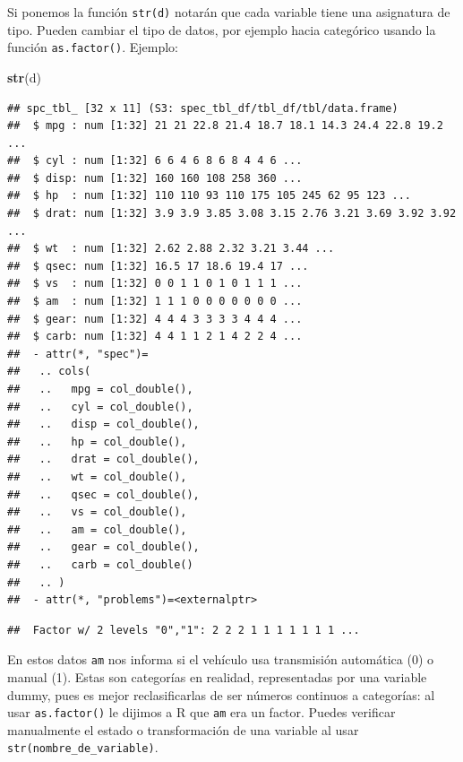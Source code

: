 \documentclass[
]{article}
\newenvironment{Shaded}{\begin{snugshade}}{\end{snugshade}}
\newcommand{\FunctionTok}[1]{\textcolor[rgb]{0.13,0.29,0.53}{\textbf{#1}}}
\newcommand{\NormalTok}[1]{#1}
\newcommand{\OtherTok}[1]{\textcolor[rgb]{0.56,0.35,0.01}{#1}}
\newcommand{\SpecialCharTok}[1]{\textcolor[rgb]{0.81,0.36,0.00}{\textbf{#1}}}
\begin{document}
Si ponemos la función \texttt{str(d)} notarán que cada variable tiene
una asignatura de tipo. Pueden cambiar el tipo de datos, por ejemplo
hacia categórico usando la función \texttt{as.factor()}. Ejemplo:

\begin{Shaded}
\begin{Highlighting}[]
\FunctionTok{str}\NormalTok{(d)}
\end{Highlighting}
\end{Shaded}

\begin{verbatim}
## spc_tbl_ [32 x 11] (S3: spec_tbl_df/tbl_df/tbl/data.frame)
##  $ mpg : num [1:32] 21 21 22.8 21.4 18.7 18.1 14.3 24.4 22.8 19.2 ...
##  $ cyl : num [1:32] 6 6 4 6 8 6 8 4 4 6 ...
##  $ disp: num [1:32] 160 160 108 258 360 ...
##  $ hp  : num [1:32] 110 110 93 110 175 105 245 62 95 123 ...
##  $ drat: num [1:32] 3.9 3.9 3.85 3.08 3.15 2.76 3.21 3.69 3.92 3.92 ...
##  $ wt  : num [1:32] 2.62 2.88 2.32 3.21 3.44 ...
##  $ qsec: num [1:32] 16.5 17 18.6 19.4 17 ...
##  $ vs  : num [1:32] 0 0 1 1 0 1 0 1 1 1 ...
##  $ am  : num [1:32] 1 1 1 0 0 0 0 0 0 0 ...
##  $ gear: num [1:32] 4 4 4 3 3 3 3 4 4 4 ...
##  $ carb: num [1:32] 4 4 1 1 2 1 4 2 2 4 ...
##  - attr(*, "spec")=
##   .. cols(
##   ..   mpg = col_double(),
##   ..   cyl = col_double(),
##   ..   disp = col_double(),
##   ..   hp = col_double(),
##   ..   drat = col_double(),
##   ..   wt = col_double(),
##   ..   qsec = col_double(),
##   ..   vs = col_double(),
##   ..   am = col_double(),
##   ..   gear = col_double(),
##   ..   carb = col_double()
##   .. )
##  - attr(*, "problems")=<externalptr>
\end{verbatim}

\begin{Shaded}
\end{Shaded}

\begin{verbatim}
##  Factor w/ 2 levels "0","1": 2 2 2 1 1 1 1 1 1 1 ...
\end{verbatim}

En estos datos \texttt{am} nos informa si el vehículo usa transmisión
automática (0) o manual (1). Estas son categorías en realidad,
representadas por una variable dummy, pues es mejor reclasificarlas de
ser números continuos a categorías: al usar \texttt{as.factor()} le
dijimos a R que \texttt{am} era un factor. Puedes verificar manualmente
el estado o transformación de una variable al usar
\texttt{str(nombre\_de\_variable)}.
\end{document}
